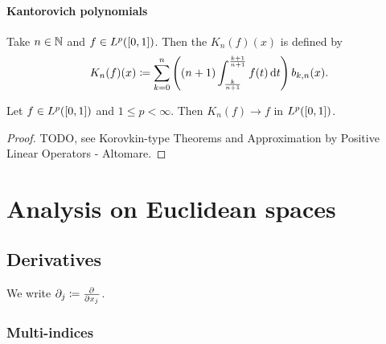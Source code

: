 \subsubsection{Kantorovich polynomials}
\begin{definition}
Take $n\in \mathbb{N}$ and $f\in L^p(\interval{0,1})$. Then the  $K_n(f)(x)$ is defined by
\[ K_n(f)(x) \coloneqq \sum_{k=0}^n\left((n+1)\int_{\frac{k}{n+1}}^{\frac{k+1}{n+1}}f(t)\operatorname{d \!}{t}\right)b_{k,n}(x). \]
\end{definition}

\begin{proposition}
Let $f\in L^p(\interval{0,1})$ and $1\leq p <\infty$. Then $K_n(f) \to f$ in $L^p(\interval{0,1})$.
\end{proposition}
\begin{proof}
TODO, see Korovkin-type Theorems and Approximation by Positive Linear Operators - Altomare.
\end{proof}

\chapter{Analysis on Euclidean spaces}
\section{Derivatives}
\begin{definition}
We write $\partial_j \coloneqq  \frac{\partial{^{}}}{\partial{{x_j}^{}}} $.
\end{definition}

\subsection{Multi-indices}

